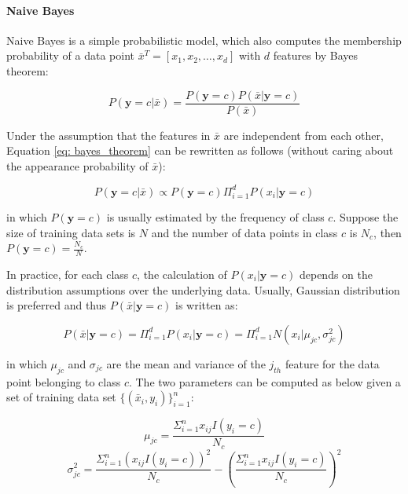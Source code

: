 \paragraph{Naive Bayes} Naive Bayes is a simple probabilistic model, which also computes the membership probability of a data point $\bar{x}^T = [x_1, x_2, \dots, x_d]$ with $d$ features by Bayes theorem:

\begin{equation}\label{eq: bayes_theorem}
P(\textbf{y}=c|\bar{x}) = \frac{P(\textbf{y}=c)P(\bar{x}|\textbf{y}=c)}{P(\bar{x})}    
\end{equation}

Under the assumption that the features in $\bar{x}$ are independent from each other, Equation \ref{eq: bayes_theorem} can be rewritten as follows (without caring about the appearance probability of $\bar{x}$):

\begin{equation}\label{eq: nb_exp}
    P(\textbf{y}=c|\bar{x}) \propto P(\textbf{y}=c)\Pi_{i=1}^dP(x_i|\textbf{y}=c)
\end{equation}

in which $P(\textbf{y}=c)$ is usually estimated by the frequency of class $c$. Suppose the size of training data sets is $N$ and the number of data points in class $c$ is $N_c$, then $P(\textbf{y}=c) = \frac{N_c}{N}$.

In practice, for each class $c$, the calculation of $P(x_i|\textbf{y}=c)$ depends on the distribution assumptions over the underlying data. Usually, Gaussian distribution is preferred and thus $P(\bar{x}|\textbf{y}=c)$ is written as:

\begin{equation}\label{eq: nb_guassian}
    P(\bar{x}|\textbf{y}=c) = \Pi_{i=1}^dP(x_i|\textbf{y}=c) = \Pi_{i=1}^dN(x_i|\mu_{jc}, \sigma_{jc}^2)
\end{equation}

in which $\mu_{jc}$ and $\sigma_{jc}$ are the mean and variance of the $j_{th}$ feature for the data point belonging to class $c$. The two parameters can be computed as below given a set of training data set $\{(\bar{x}_i, y_i)\}_{i=1}^n$:

\begin{equation}\label{eq: nb_mean}
    \mu_{jc} = \frac{\Sigma_{i=1}^nx_{ij}I(y_i=c)}{N_c}
\end{equation}
\begin{equation}\label{eq: nb_var}
    \sigma_{jc}^2 = \frac{\Sigma_{i=1}^n(x_{ij}I(y_i=c))^2}{N_c}-(\frac{\Sigma_{i=1}^nx_{ij}I(y_i=c)}{N_c})^2
\end{equation}

